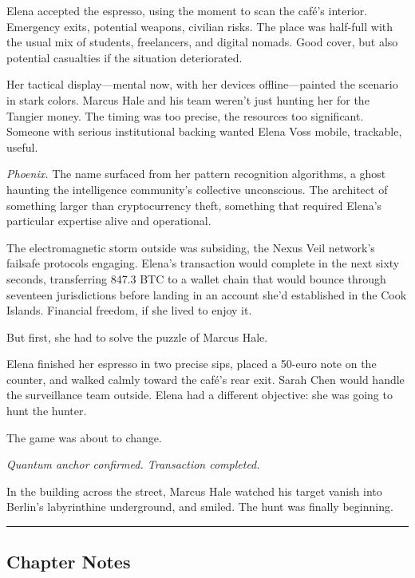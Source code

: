 Elena accepted the espresso, using the moment to scan the café's interior. Emergency exits, potential weapons, civilian risks. The place was half-full with the usual mix of students, freelancers, and digital nomads. Good cover, but also potential casualties if the situation deteriorated.

Her tactical display---mental now, with her devices offline---painted the scenario in stark colors. Marcus Hale and his team weren't just hunting her for the Tangier money. The timing was too precise, the resources too significant. Someone with serious institutional backing wanted Elena Voss mobile, trackable, useful.

\emph{Phoenix.} The name surfaced from her pattern recognition algorithms, a ghost haunting the intelligence community's collective unconscious. The architect of something larger than cryptocurrency theft, something that required Elena's particular expertise alive and operational.

The electromagnetic storm outside was subsiding, the Nexus Veil network's failsafe protocols engaging. Elena's transaction would complete in the next sixty seconds, transferring 847.3 BTC to a wallet chain that would bounce through seventeen jurisdictions before landing in an account she'd established in the Cook Islands. Financial freedom, if she lived to enjoy it.

But first, she had to solve the puzzle of Marcus Hale.

Elena finished her espresso in two precise sips, placed a 50-euro note on the counter, and walked calmly toward the café's rear exit. Sarah Chen would handle the surveillance team outside. Elena had a different objective: she was going to hunt the hunter.

The game was about to change.

\emph{Quantum anchor confirmed. Transaction completed.}

In the building across the street, Marcus Hale watched his target vanish into Berlin's labyrinthine underground, and smiled. The hunt was finally beginning.

\begin{center}\rule{0.5\linewidth}{0.5pt}\end{center}

\hypertarget{chapter-notes}{%
\subsection{Chapter Notes}\label{chapter-notes}}

